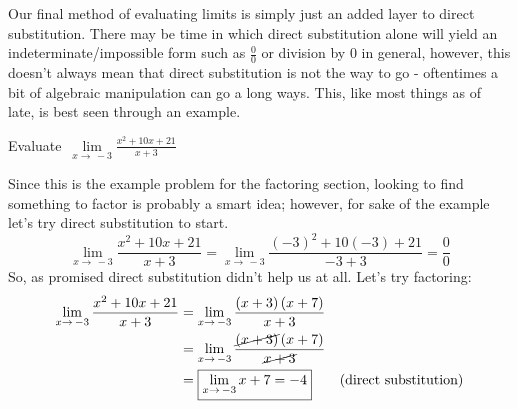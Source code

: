 \documentclass[addpoints]{exam}
\begin{document}
\begin{tcolorbox}[breakable, title=FACTORING, colframe=black, sharp corners, colback=white, colbacktitle=white, coltitle=black]
	Our final method of evaluating limits is simply just an added layer to direct substitution. There may be time in which direct substitution alone will yield an indeterminate/impossible form such as $\frac{0}{0}$ or division by $0$ in general, however, this doesn't always mean that direct substitution is not the way to go - oftentimes a bit of algebraic manipulation can go a long ways. This, like most things as of late, is best seen through an example.
\end{tcolorbox}
\begin{questions}
	\question Evaluate $\displaystyle\, \lim\limits_{x\to\,-3} \frac{x^2+10x+21}{x+3}$
	\begin{solution}[2.5in]
		Since this is the example problem for the factoring section, looking to find something to factor is probably a smart idea; however, for sake of the example let's try direct substitution to start.
		\[
			\lim\limits_{x\to\,-3}\frac{x^2+10x+21}{x+3} = \lim\limits_{x\to\,-3}\frac{\left(-3\right)^2 + 10(-3) + 21}{-3+3} = \frac{0}{0}
		\]
		So, as promised direct substitution didn't help us at all. Let's try factoring:
		\begin{align*}
			\lim\limits_{x\to\,-3}\frac{x^2+10x+21}{x+3} & = \lim\limits_{x\to\,-3}\frac{\left(x+3\right)\left(x+7\right)}{x+3}                   \\
			                                             & = \lim\limits_{x\to\,-3}\frac{\cancel{\left(x+3\right)}\left(x+7\right)}{\cancel{x+3}} \\
			                                             & = \boxed{\lim\limits_{x\to\,-3}x+7 = -4} \tag{direct substitution}
		\end{align*}
	\end{solution}
\end{questions}
\end{document}
